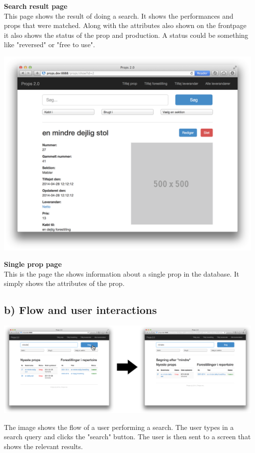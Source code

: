 \documentclass[12pt]{article}
\begin{document}
\newline
\textbf{Search result page}\\
This page shows the result of doing a search. It shows the performances and props that were matched. Along with the attributes also shown on the frontpage it also shows the status of the prop and production. A status could be something like "reversed" or "free to use".
\newline
\newline
\centerline{\includegraphics[scale=0.25]{ui-prop-show.png}}
\newline
\textbf{Single prop page}\\
This is the page the shows information about a single prop in the database. It simply shows the attributes of the prop.
\subsection{b) Flow and user interactions}
\centerline{\includegraphics[scale=0.15]{flow.png}}
The image shows the flow of a user performing a search. The user types in a search query and clicks the "search" button. The user is then sent to a screen that shows the relevant results.
\end{document}
